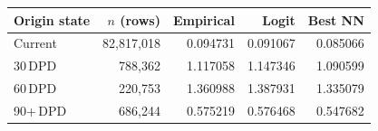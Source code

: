 \begin{tabular}{lrrrr}
\toprule
Origin state & $n$ (rows) & Empirical & Logit & Best NN \\
\midrule
Current   & 82{,}817{,}018 & 0.094731 & 0.091067 & 0.085066 \\
30\,DPD   &    788{,}362 & 1.117058 & 1.147346 & 1.090599 \\
60\,DPD   &    220{,}753 & 1.360988 & 1.387931 & 1.335079 \\
90+\,DPD  &    686{,}244 & 0.575219 & 0.576468 & 0.547682 \\
\bottomrule
\end{tabular}
